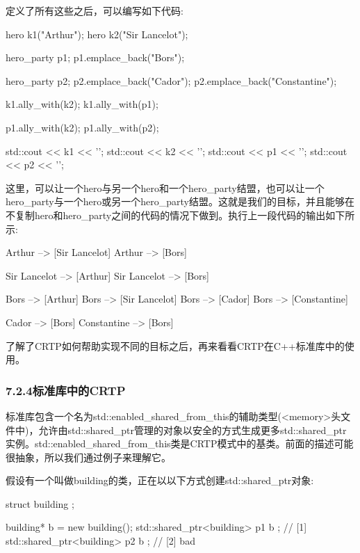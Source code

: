 定义了所有这些之后，可以编写如下代码:

\begin{cpp}
hero k1("Arthur");
hero k2("Sir Lancelot");

hero_party p1;
p1.emplace_back("Bors");

hero_party p2;
p2.emplace_back("Cador");
p2.emplace_back("Constantine");

k1.ally_with(k2);
k1.ally_with(p1);

p1.ally_with(k2);
p1.ally_with(p2);

std::cout << k1 << '\n';
std::cout << k2 << '\n';
std::cout << p1 << '\n';
std::cout << p2 << '\n';
\end{cpp}

这里，可以让一个hero与另一个hero和一个hero\_party结盟，也可以让一个hero\_party与一个hero或另一个hero\_party结盟。这就是我们的目标，并且能够在不复制hero和hero\_party之间的代码的情况下做到。执行上一段代码的输出如下所示:

\begin{shell}
Arthur --> [Sir Lancelot]
Arthur --> [Bors]

Sir Lancelot --> [Arthur]
Sir Lancelot --> [Bors]

Bors --> [Arthur]
Bors --> [Sir Lancelot]
Bors --> [Cador]
Bors --> [Constantine]

Cador --> [Bors]
Constantine --> [Bors]
\end{shell}

了解了CRTP如何帮助实现不同的目标之后，再来看看CRTP在C++标准库中的使用。

\subsubsection{7.2.4\hspace{0.2cm}标准库中的CRTP}

标准库包含一个名为std::enabled\_shared\_from\_this的辅助类型(<memory>头文件中)，允许由std::shared\_ptr管理的对象以安全的方式生成更多std::shared\_ptr实例。std::enabled\_shared\_from\_this类是CRTP模式中的基类。前面的描述可能很抽象，所以我们通过例子来理解它。

假设有一个叫做building的类，正在以以下方式创建std::shared\_ptr对象:

\begin{cpp}
struct building {};

building* b = new building();
std::shared_ptr<building> p1{ b }; // [1]
std::shared_ptr<building> p2{ b }; // [2] bad
\end{cpp}


